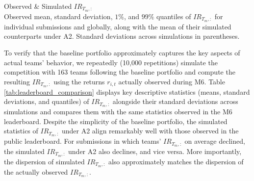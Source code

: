 \documentclass[3p,times,twocolumn]{elsarticle}
\begin{document}
\begin{table}[!htbp]
    \fontsize{5}{5}\selectfont
    \centering
    \caption{
        Observed \& Simulated $IR_{T_{m},:}$\\
        \footnotesize
        Observed mean, standard deviation, $1\%$, and $99\%$ quantiles of $IR_{T_{m},:}$ for individual submissions and globally, along with the mean of their simulated counterparts under A2.
        Standard deviations across simulations in parentheses.
    }
    \label{tab:leaderboard_comparison}
\end{table}

To verify that the baseline portfolio approximately captures the key aspects of actual teams’ behavior, we repeatedly (10,000 repetitions) simulate the competition with 163 teams following the baseline portfolio and compute the resulting $IR_{T_{m},:}$ using the returns $r_{i,t}$ actually observed during M6.
Table \ref{tab:leaderboard_comparison} displays key descriptive statistics (means, standard deviations, and quantiles) of $IR_{T_{m},:}$ alongside their standard deviations across simulations and compares them with the same statistics observed in the M6 leaderboard. 
Despite the simplicity of the baseline portfolio, the simulated statistics of $IR_{T_{m},:}$ under A2 align remarkably well with those observed in the public leaderboard. 
For submissions in which teams' $IR_{T_{m},:}$ on average declined, the simulated $IR_{T_{m},:}$ under A2 also declines, and vice versa.
More importantly, the dispersion of simulated $IR_{T_{m},:}$ also approximately matches the dispersion of the actually observed $IR_{T_{m},:}$.
\end{document}
